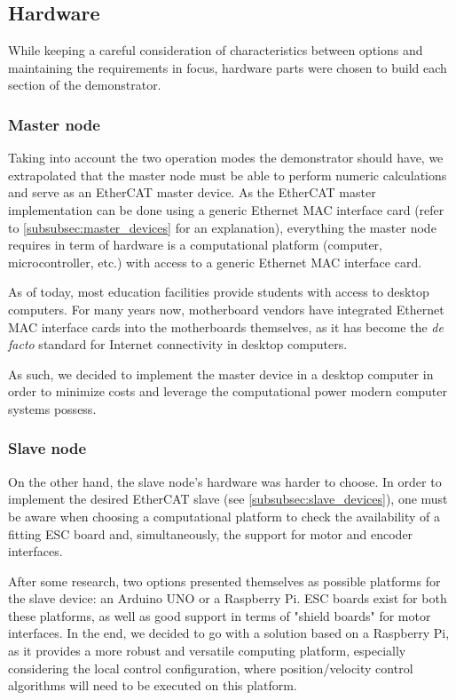\subsection{Hardware} \label{sec:proposed-hardware}

While keeping a careful consideration of characteristics between options and maintaining the requirements in focus, hardware parts were chosen to build each section of the demonstrator.

\subsubsection{Master node}

Taking into account the two operation modes the demonstrator should have, we extrapolated that the master node must be able to perform numeric calculations and serve as an EtherCAT master device.
As the EtherCAT master implementation can be done using a generic Ethernet MAC interface card (refer to \ref{subsubsec:master_devices} for an explanation), everything the master node requires in term of hardware is a computational platform (computer, microcontroller, etc.) with access to a generic Ethernet MAC interface card.

As of today, most education facilities provide students with access to desktop computers.
For many years now, motherboard vendors have integrated Ethernet MAC interface cards into the motherboards themselves, as it has become the \emph{de facto} standard for Internet connectivity in desktop computers.

As such, we decided to implement the master device in a desktop computer in order to minimize costs and leverage the computational power modern computer systems possess.

\subsubsection{Slave node}

On the other hand, the slave node's hardware was harder to choose.
In order to implement the desired EtherCAT slave (see \ref{subsubsec:slave_devices}), one must be aware when choosing a computational platform to check the availability of a fitting ESC board and, simultaneously, the support for motor and encoder interfaces.

After some research, two options presented themselves as possible platforms for the slave device: an Arduino UNO or a Raspberry Pi.
ESC boards exist for both these platforms, as well as good support in terms of "shield boards" for motor interfaces.
In the end, we decided to go with a solution based on a Raspberry Pi, as it provides a more robust and versatile computing platform, especially considering the local control configuration, where position/velocity control algorithms will need to be executed on this platform.

